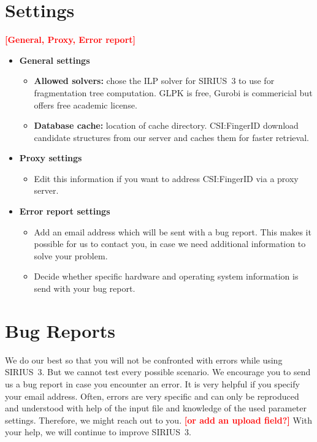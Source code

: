 \documentclass[letterpaper,10pt,openany,oneside]{sphinxmanual}
\newcommand{\todo}[1]{\xspace{\bfseries\sffamily\textcolor{red}{[#1]}}\xspace}
\begin{document}

\section{Settings}
\todo{General, Proxy, Error report}
\begin{itemize}
\item \textbf{General settings}
\begin{itemize}
	\item \textbf{Allowed solvers:} chose the ILP solver for SIRIUS~3 to use for fragmentation tree computation. GLPK is free, Gurobi is commericial but offers free academic license.
	\item \textbf{Database cache:} location of cache directory. CSI:FingerID download candidate structures from our server and caches them for faster retrieval.
\end{itemize}

\item \textbf{Proxy settings}
\begin{itemize}
	\item Edit this information if you want to address CSI:FingerID via a proxy server.
\end{itemize}

\item \textbf{Error report settings}
\begin{itemize}
	\item Add an email address which will be sent with a bug report. This makes it possible for us to contact you, in case we need additional information to solve your problem. 
	\item Decide whether specific hardware and operating system information is send with your bug report.
\end{itemize}

\end{itemize}


\section{Bug Reports}

We do our best so that you will not be confronted with errors while using
SIRIUS~3.  But we cannot test every possible scenario.  We encourage you to
send us a bug report in case you encounter an error.  It is very helpful if
you specify your email address. Often, errors are very specific and can only
be reproduced and understood with help of the input file and knowledge of the
used parameter settings. Therefore, we might reach out to you. \todo{or add
an upload field?}  With your help, we will continue to improve SIRIUS~3.
\end{document}
